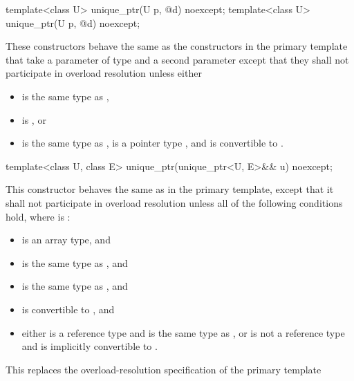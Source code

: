 %
\begin{itemdecl}
template<class U> unique_ptr(U p, @\seebelow@ d) noexcept;
template<class U> unique_ptr(U p, @\seebelow@ d) noexcept;
\end{itemdecl}

\begin{itemdescr}
\pnum
These constructors behave the same as
the constructors in the primary template that
take a parameter of type  and a second parameter
except that they
shall not participate in overload resolution unless either

\begin{itemize}
\item {} is the same type as ,
\item {} is , or
\item {} is the same type as ,
       is a pointer type , and
       is convertible to .
\end{itemize}
\end{itemdescr}

%
\begin{itemdecl}
template<class U, class E> unique_ptr(unique_ptr<U, E>&& u) noexcept;
\end{itemdecl}

\begin{itemdescr}
\pnum
This constructor behaves the same as in the primary template,
except that it shall not participate in overload resolution
unless all of the following conditions hold,
where  is :

\begin{itemize}
\item {} is an array type, and
\item {} is the same type as , and
\item {} is the same type as , and
\item {} is convertible to , and
\item either  is a reference type and  is the same type as ,
      or  is not a reference type and  is implicitly convertible to .
\end{itemize}

\begin{note}
This replaces the overload-resolution specification of the primary template
\end{note}
\end{itemdescr}

